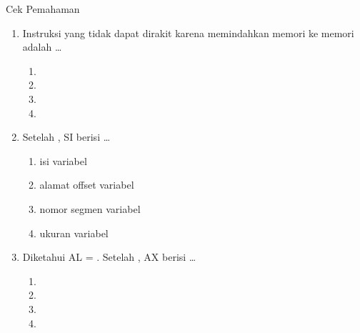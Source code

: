 \documentclass[aspectratio=169,11pt]{beamer}
\begin{document}
\begin{frame}{Cek Pemahaman}
\footnotesize
\begin{enumerate}
    \item Instruksi yang tidak dapat dirakit karena memindahkan
          memori ke memori adalah \dots
          \begin{enumerate}
              \item {}
              \item {}
              \item {}
              \item {}
          \end{enumerate}

    \vspace{0.2em}
    \item Setelah , SI berisi \dots
          \begin{enumerate}
              \item isi variabel 
              \item alamat offset variabel 
              \item nomor segmen variabel 
              \item ukuran variabel 
          \end{enumerate}

    \vspace{0.2em}
    \item Diketahui AL = . Setelah , AX berisi
          \dots
          \begin{enumerate}
              \item {} \quad \item {} \quad
              \item {} \quad \item {}
          \end{enumerate}
\end{enumerate}
\end{frame}
\end{document}
